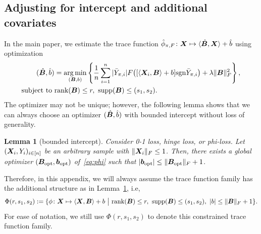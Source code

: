 \documentclass[11pt]{article}
\theoremstyle{plain}
\newtheorem{lem}{Lemma}
\theoremstyle{definition}
\def\sign{\textup{sgn}}
\def\rank{\textup{rank}}
\def\supp{\textup{supp}}
\begin{document}
\subsection{Adjusting for intercept and additional covariates}\label{sec:intercept}
In the main paper, we estimate the trace function $\hat \phi_{\pi,F}\colon \bm X\mapsto \langle \hat {\bm B}, \bm X \rangle + \hat b$ using optimization
\begin{align}\label{eq:phi}
(\hat \mB,\hat b)& = \argmin_{(\mB,b)} \left\{{1\over n}\sum_{i=1}^n|\bar Y_{\pi, i}| F\big( [\langle \mX_i,\mB \rangle+b] \sign \bar Y_{\pi, i}\big) + \lambda\FnormSize{}{\mB}^2\right\},\notag \\
\text{subject to }& \rank(\mB)\leq r,\ \supp(\mB)\leq (s_1,s_2).
\end{align}
The optimizer may not be unique; however, the following lemma shows that we can always choose an optimizer $(\hat {\bm B}, \hat b)$ with bounded intercept without loss of generality. 

\begin{lem}[bounded intercept]\label{lem:intercept} Consider 0-1 loss, hinge loss, or phi-loss. Let $(\bm X_i,Y_i)_{i\in[n]}$ be an arbitrary sample with $\lVert\bm X_i\rVert_F\leq 1$. Then, there exists a global optimizer $( \bm B_{\textup{opt}}, \bm{b}_{\textup{opt}})$ of~\eqref{eq:phi} such that $|\bm{b}_{\textup{opt}}|\leq \lVert\bm B_{\textup{opt}}\rVert_F+1$. 
\end{lem}
Therefore, in this appendix, we will always assume the trace function family has the additional structure as in Lemma~\ref{lem:intercept}, i.e, 
\[
\Phi(r,s_1,s_2):=\{\phi\colon \mX\mapsto \langle \mX,\mB \rangle+b \ \big|\ \rank(\mB)\leq r,\ \supp(\mB)\leq (s_1,s_2),\ |b|\leq \FnormSize{}{\mB}+1\}.
\]
For ease of notation, we still use $\Phi(r,s_1,s_2)$ to denote this constrained trace function family.
\end{document}
